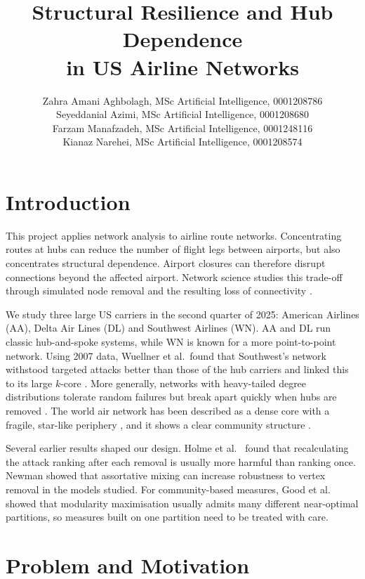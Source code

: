 \documentclass[12pt, a4paper]{article}
\author{Zahra Amani Aghbolagh, MSc Artificial Intelligence, 0001208786
\\Seyeddanial Azimi, MSc Artificial Intelligence, 0001208680
\\Farzam Manafzadeh, MSc Artificial Intelligence, 0001248116
\\Kianaz Narehei, MSc Artificial Intelligence, 0001208574}
\date{}
\title{Structural Resilience and Hub Dependence\\in US Airline Networks}
\begin{document}
\maketitle

\section{Introduction}
\label{introduction}

This project applies network analysis to airline route networks. Concentrating routes at hubs can reduce the number of flight legs between airports, but also concentrates structural dependence. Airport closures can therefore disrupt connections beyond the affected airport. Network science studies this trade-off through simulated node removal and the resulting loss of connectivity \cite{albert2000,holme2002}.

We study three large US carriers in the second quarter of 2025: American Airlines
(AA), Delta Air Lines (DL) and Southwest Airlines (WN). AA and DL run classic
hub-and-spoke systems, while WN is known for a more point-to-point network. Using 2007
data, Wuellner et al.\ found that Southwest's network withstood targeted attacks better
than those of the hub carriers and linked this to its large $k$-core
\cite{wuellner2010}. More generally, networks with heavy-tailed degree distributions
tolerate random failures but break apart quickly when hubs are removed
\cite{albert2000}. The world air network has been described as a dense core with a
fragile, star-like periphery \cite{verma2014}, and it shows a clear community
structure \cite{guimera2005}.

Several earlier results shaped our design. Holme et al.\ \cite{holme2002} found that
recalculating the attack ranking after each removal is usually more harmful than ranking once. Newman \cite{newman2002} showed that assortative mixing can increase robustness to vertex removal in the models studied. For community-based
measures, Good et al.\ \cite{good2010} showed that modularity maximisation usually
admits many different near-optimal partitions, so measures built on one partition
need to be treated with care.

\section{Problem and Motivation}
\label{problem-and-motivation}
\end{document}
